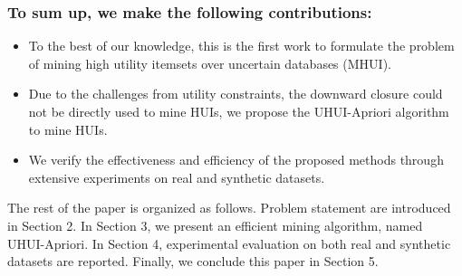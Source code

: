 \documentclass[conference]{IEEEtran}
\begin{document}
\vspace{-0.1cm}
\subsubsection*{To sum up, we make the following contributions:}

\begin{itemize}
\vspace{-0.2cm}
\item	To the best of our knowledge, this is the first work to formulate the problem of mining high utility itemsets over uncertain databases (MHUI).
\item   Due to the challenges from utility constraints, the downward closure could not be directly used to mine HUIs, we propose the UHUI-Apriori algorithm to mine HUIs.
\item   We verify the effectiveness and efficiency of the proposed methods through extensive experiments on real and synthetic datasets.
\vspace{-0.2cm}
\end{itemize}

The rest of the paper is organized as follows. Problem statement are introduced in Section 2. In Section 3, we present an efficient mining algorithm, named UHUI-Apriori. In Section 4, experimental evaluation on both real and synthetic datasets are reported. Finally, we conclude this paper in Section 5.




%
%
\end{document}
